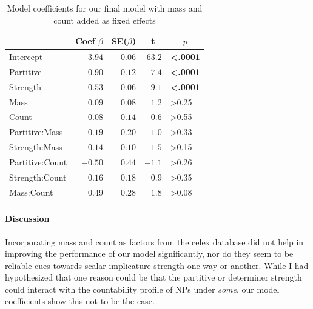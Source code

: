\documentclass[10pt, biblatex, linguex]{report}
\begin{document}
\begin{table}[t]
    \centering
    \begin{tabular}{lrrrl}
    \multicolumn{1}{l}{}&\multicolumn{1}{c}{Coef $\beta$}&\multicolumn{1}{c}{SE($\beta$)}&
    \multicolumn{1}{c}{\textbf{t}}&\multicolumn{1}{c}{$p$}\tabularnewline
    \midrule
    Intercept&$ 3.94$&$0.06$&$63.2$&\textbf{\textless .0001}\tabularnewline
    Partitive&$ 0.90$&$0.12$&$ 7.4$&\textbf{\textless .0001}\tabularnewline
    Strength&$-0.53$&$0.06$&$-9.1$&\textbf{\textless .0001}\tabularnewline
    Mass&$ 0.09$&$0.08$&$ 1.2$&\textgreater 0.25\tabularnewline
    Count&$ 0.08$&$0.14$&$ 0.6$&\textgreater 0.55\tabularnewline
    Partitive:Mass&$ 0.19$&$0.20$&$ 1.0$&\textgreater 0.33\tabularnewline
    Strength:Mass&$-0.14$&$0.10$&$-1.5$&\textgreater 0.15\tabularnewline
    Partitive:Count&$-0.50$&$0.44$&$-1.1$&\textgreater 0.26\tabularnewline
    Strength:Count&$ 0.16$&$0.18$&$ 0.9$&\textgreater 0.35\tabularnewline
    Mass:Count&$ 0.49$&$0.28$&$ 1.8$&\textgreater 0.08\tabularnewline
    \end{tabular}
    \caption{Model coefficients for our final model with {\rmsc mass} and {\rmsc
             count} added as fixed effects}
    \label{tab:coeffs}
\end{table}

\paragraph{Discussion} Incorporating {\rmsc mass} and {\rmsc count} as factors
from the {\rmsc celex} database did not help in improving the performance of
our model significantly, nor do they seem to be reliable cues towards
scalar implicature strength one way or another. While I had hypothesized that
one reason could be that the partitive or determiner strength could interact
with the countability profile of NPs under \textit{some}, our model coefficients
show this not to be the case.
\end{document}
